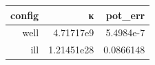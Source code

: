 \begin{tabular}{rrr}
  \toprule
  \textbf{config} & \textbf{κ} & \textbf{pot\_err} \\
  \midrule
  well & 4.71717e9 & 5.4984e-7 \\
  ill & 1.21451e28 & 0.0866148 \\
  \bottomrule
\end{tabular}
